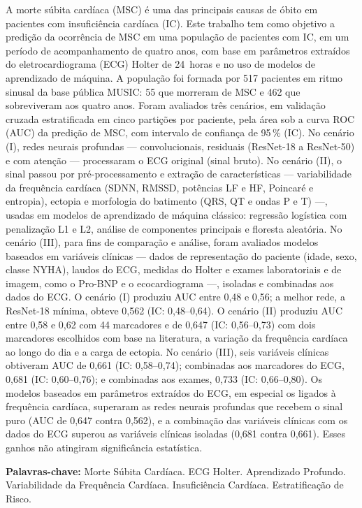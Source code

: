 A morte súbita cardíaca (MSC) é uma das principais causas de óbito em
pacientes com insuficiência cardíaca (IC). Este trabalho tem como objetivo a
predição da ocorrência de MSC em uma população de pacientes com IC, em um
período de acompanhamento de quatro anos, com base em parâmetros extraídos
do eletrocardiograma (ECG) Holter de 24~horas e no uso de modelos de
aprendizado de máquina. A população foi formada por 517 pacientes em ritmo
sinusal da base pública MUSIC: 55 que morreram de MSC e 462 que sobreviveram
aos quatro anos. Foram avaliados três cenários, em validação cruzada
estratificada em cinco partições por paciente, pela área sob a curva ROC
(AUC) da predição de MSC, com intervalo de confiança de 95\,\% (IC). No
cenário (I), redes neurais profundas --- convolucionais, residuais (ResNet-18
a ResNet-50) e com atenção --- processaram o ECG original (sinal bruto). No
cenário (II), o sinal passou por pré-processamento e extração de
características --- variabilidade da frequência cardíaca (SDNN, RMSSD,
potências LF e HF, Poincaré e entropia), ectopia e morfologia do batimento
(QRS, QT e ondas P e T) ---, usadas em modelos de aprendizado de máquina
clássico: regressão logística com penalização L1 e L2, análise de
componentes principais e floresta aleatória. No cenário (III), para fins de
comparação e análise, foram avaliados modelos baseados em variáveis
clínicas --- dados de representação do paciente (idade, sexo, classe NYHA),
laudos do ECG, medidas do Holter e exames laboratoriais e de imagem, como o
Pro-BNP e o ecocardiograma ---, isoladas e combinadas aos dados do ECG. O
cenário (I) produziu AUC entre 0,48 e 0,56; a melhor rede, a ResNet-18
mínima, obteve 0,562 (IC: 0,48--0,64). O cenário (II) produziu AUC entre
0,58 e 0,62 com 44 marcadores e de 0,647 (IC: 0,56--0,73) com dois
marcadores escolhidos com base na literatura, a variação da frequência
cardíaca ao longo do dia e a carga de ectopia. No cenário (III), seis
variáveis clínicas obtiveram AUC de 0,661 (IC: 0,58--0,74); combinadas aos
marcadores do ECG, 0,681 (IC: 0,60--0,76); e combinadas aos exames, 0,733
(IC: 0,66--0,80). Os modelos baseados em parâmetros extraídos do ECG, em
especial os ligados à frequência cardíaca, superaram as redes neurais
profundas que recebem o sinal puro (AUC de 0,647 contra 0,562), e a
combinação das variáveis clínicas com os dados do ECG superou as variáveis
clínicas isoladas (0,681 contra 0,661). Esses ganhos não atingiram
significância estatística.

\textbf{Palavras-chave:} Morte Súbita Cardíaca. ECG Holter. Aprendizado
Profundo. Variabilidade da Frequência Cardíaca. Insuficiência Cardíaca.
Estratificação de Risco.
